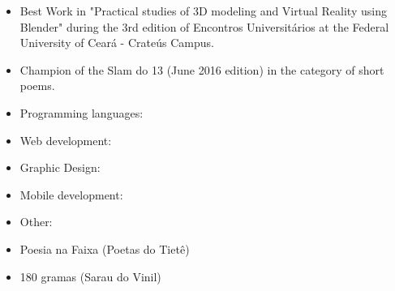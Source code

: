 \vspace{0.5 mm}
\begin{itemize}
\item Best Work in "Practical studies of 3D modeling and Virtual Reality using Blender" during the 3rd edition of Encontros Universitários at the Federal University of Ceará - Crateús Campus.
\smallskip
\item Champion of the Slam do 13 (June 2016 edition) in the category of short poems.
\end{itemize}

\begin{itemize}
\item Programming languages:
\end{itemize}

\smallskip

\begin{itemize}
\item Web development:
\end{itemize}

\smallskip

\begin{itemize}
\item Graphic Design:
\end{itemize}

\smallskip

\begin{itemize}
\item Mobile development:
\end{itemize}

\smallskip

\begin{itemize}
\item Other:
\end{itemize}

\vspace{2 mm}

\smallskip
{}
\smallskip
{}
\begin{itemize}
\item Poesia na Faixa (Poetas do Tietê)
\item 180 gramas (Sarau do Vinil)
\end{itemize}


